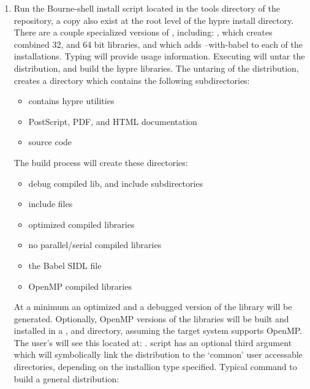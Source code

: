 \begin{enumerate}
   \item Run the Bourne-shell install script  located in 
   the tools directory of the \hypre{} repository, a copy also
   exist at the root level of the hypre install directory. There are
   a couple specialized versions of , including:
   , which creates combined 32, and 64 bit
   libraries, and  which adds --with-babel to
   each of the installations. Typing
    will provide usage information. Executing
    will untar the distribution, and build the hypre 
   libraries. The untaring of the distribution, creates a directory
    which contains the following subdirectories:
      \begin{itemize}
       \item {}     contains hypre utilities
       \item {}    PostScript, PDF, and HTML documentation
       \item {}     source code
      \end{itemize}
   The build process will create these directories:
      \begin{itemize}
       \item {}   debug compiled lib, and include subdirectories
       \item {} include files
       \item {}     optimized compiled libraries
       \item {}  no parallel/serial compiled libraries
       \item {}   the Babel SIDL file
       \item {} OpenMP compiled libraries
      \end{itemize}
   At a minimum an optimized and a debugged version of the library will
   be generated. Optionally, OpenMP versions of the libraries will
   be built and installed in a , and 
   directory, assuming the target system supports OpenMP. The
   user's will see this located at: .
    script has an optional third argument  which 
   will symbolically link the distribution to the `common' user
   accessable directories, depending on the installion type
   specified. Typical command to build a general distribution:\linebreak
   \linebreak

\end{enumerate}
